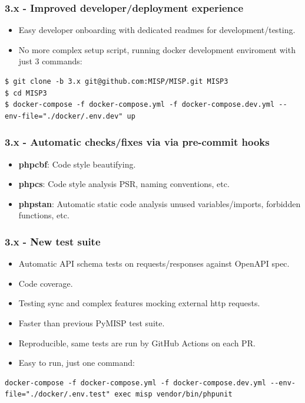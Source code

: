 \begin{frame}[fragile]
        \frametitle{3.x - Improved developer/deployment experience}
	\begin{itemize}
		\item Easy developer onboarding with dedicated readmes for development/testing.
		\item No more complex setup script, running docker development enviroment with just 3 commands:
	\end{itemize}
\begin{lstlisting}[basicstyle=\ttfamily\small, breaklines=true]
$ git clone -b 3.x git@github.com:MISP/MISP.git MISP3
$ cd MISP3
$ docker-compose -f docker-compose.yml -f docker-compose.dev.yml --env-file="./docker/.env.dev" up
\end{lstlisting}
\end{frame}

\begin{frame}
        \frametitle{3.x - Automatic checks/fixes via via pre-commit hooks}
	\begin{itemize}
		\item {\bf phpcbf}: Code style beautifying.
		\item {\bf phpcs}: Code style analysis PSR, naming conventions, etc.
		\item {\bf phpstan}: Automatic static code analysis unused variables/imports, forbidden functions, etc.
	\end{itemize}
\end{frame}

\begin{frame}[fragile]
	\frametitle{3.x - New test suite}
	\begin{itemize}
		\item Automatic API schema tests on requests/responses against OpenAPI spec.
		\item Code coverage.
		\item Testing sync and complex features mocking external http requests.
		\item Faster than previous PyMISP test suite.
		\item Reproducible, same tests are run by GitHub Actions on each PR.
		\item Easy to run, just one command:
	\end{itemize}
	\begin{lstlisting}[basicstyle=\ttfamily\small, breaklines=true,]
docker-compose -f docker-compose.yml -f docker-compose.dev.yml --env-file="./docker/.env.test" exec misp vendor/bin/phpunit
	\end{lstlisting}
\end{frame}

